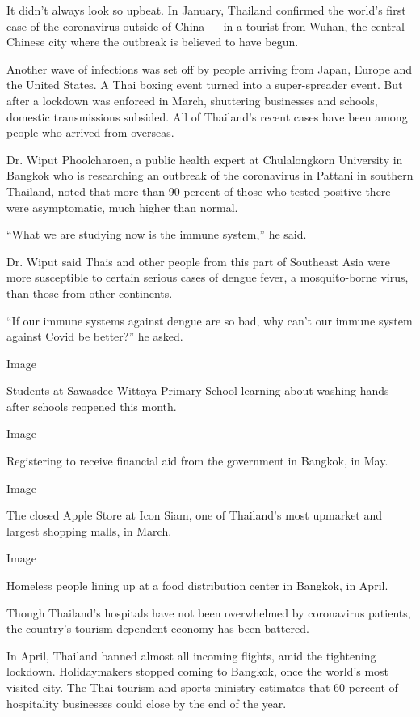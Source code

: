 It didn't always look so upbeat. In January, Thailand confirmed the
world's first case of the coronavirus outside of China --- in a tourist
from Wuhan, the central Chinese city where the outbreak is believed to
have begun.

Another wave of infections was set off by people arriving from Japan,
Europe and the United States. A Thai boxing event turned into a
super-spreader event. But after a lockdown was enforced in March,
shuttering businesses and schools, domestic transmissions subsided. All
of Thailand's recent cases have been among people who arrived from
overseas.

Dr. Wiput Phoolcharoen, a public health expert at Chulalongkorn
University in Bangkok who is researching an outbreak of the coronavirus
in Pattani in southern Thailand, noted that more than 90 percent of
those who tested positive there were asymptomatic, much higher than
normal.

``What we are studying now is the immune system,'' he said.

Dr. Wiput said Thais and other people from this part of Southeast Asia
were more susceptible to certain serious cases of dengue fever, a
mosquito-borne virus, than those from other continents.

``If our immune systems against dengue are so bad, why can't our immune
system against Covid be better?'' he asked.

Image

Students at Sawasdee Wittaya Primary School learning about washing hands
after schools reopened this month.

Image

Registering to receive financial aid from the government in Bangkok, in
May.

Image

The closed Apple Store at Icon Siam, one of Thailand's most upmarket and
largest shopping malls, in March.

Image

Homeless people lining up at a food distribution center in Bangkok, in
April.

Though Thailand's hospitals have not been overwhelmed by coronavirus
patients, the country's tourism-dependent economy has been battered.

In April, Thailand banned almost all incoming flights, amid the
tightening lockdown. Holidaymakers stopped coming to Bangkok, once the
world's most visited city. The Thai tourism and sports ministry
estimates that 60 percent of hospitality businesses could close by the
end of the year.

